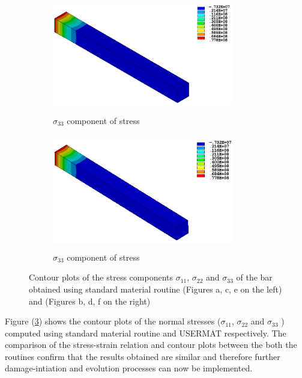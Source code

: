 \documentclass[12pt,a4paper,twoside,openright]{report}
\begin{document}
\begin{figure}[htbp!]\ContinuedFloat     
     \begin{subfigure}[b]{0.4\textwidth}
         \includegraphics[width=8cm,height=5cm]{17.Ansys_SZ.png}
         \caption{$\sigma_{33}$ component of stress}
         \label{fig:Z Component of Stress}
     \end{subfigure}
     \hspace{1.8cm}
     \begin{subfigure}[b]{0.4\textwidth}
         \includegraphics[width=8cm,height=5cm]{20.User_SZ.png}
         \caption{$\sigma_{33}$ component of stress}
         \label{fig:Z Component of Stress2}
     \end{subfigure}
        \caption{Contour plots of the stress components $\sigma_{11}$, $\sigma_{22}$ and $\sigma_{33}$ of the bar obtained using standard material routine (Figures a, c, e on the left) and  (Figures b, d, f on the right)}
        \label{fig:USERMAT}     
\end{figure}
\FloatBarrier

Figure (\ref{fig:USERMAT}) shows the contour plots of the normal stresses ($\sigma_{11}$, $\sigma_{22}$ and $\sigma_{33}$ ) computed using standard material routine and USERMAT respectively. The comparison of the stress-strain relation and contour plots between the both the routines confirm that the results obtained are similar and therefore further damage-intiation and evolution processes can now be implemented.
\end{document}
